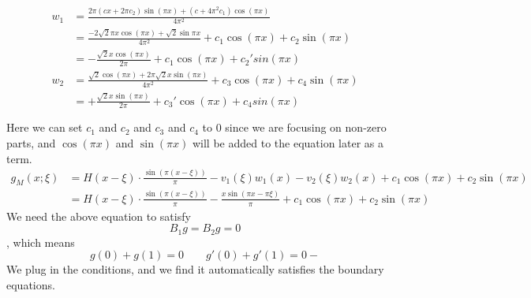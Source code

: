 \documentclass{article}
\begin{document}
\begin{align*}
   	w_1 &= \frac{2 \pi  \left(c x+2 \pi  c_2\right) \sin (\pi  x)+\left(c+4
   	\pi ^2 c_1\right) \cos (\pi  x)}{4 \pi ^2} 
   	\\&= \frac{-2 \sqrt{2}\pi  x\cos(\pi x)+\sqrt{2}\sin{\pi x}}{4 \pi^2} + c_1 \cos (\pi x) + c_2 \sin (\pi x)\\
   	&= -\frac{\sqrt{2}x\cos(\pi x)}{2 \pi}+c_1 \cos(\pi x) + c_2' sin(\pi x)\\
   	w_2 &= \frac{\sqrt{2}\cos(\pi x)+2 \pi \sqrt{2}x \sin(\pi x)}{4 \pi^2}+c_3 \cos (\pi x) + c_4 \sin (\pi x)
  	\\ &= +\frac{\sqrt{2}x\sin(\pi x)}{2 \pi}+c_3' \cos(\pi x) + c_4 sin(\pi x)\\\\
\end{align*}
Here we can set $c_1$ and $c_2$ and $c_3$ and $c_4$ to 0 since we are focusing on non-zero parts, and $\cos(\pi x)$ and $\sin(\pi x)$ will be added to the equation later as a term.
\begin{align*}
	g_M(x;\xi) &= H(x-\xi)\cdot \frac{\sin \left( \pi (x- \xi) \right)}{\pi} - v_1(\xi)w_1(x) - v_2(\xi)w_2(x) +c_1 \cos(\pi x)+c_2 \sin(\pi x) \\
	&= H(x-\xi)\cdot \frac{\sin \left( \pi (x- \xi) \right)}{\pi}- \frac{x\sin(\pi x - \pi \xi)}{\pi}+c_1 \cos(\pi x)+ c_2\sin(\pi x)
\end{align*}
We need the above equation to satisfy 
\[
	B_1g=B_2g= 0
\]
, which means 
\[
	g(0)+g(1) = 0 \qquad g'(0)+g'(1) = 0-
\] 
We plug in the conditions, and we find it automatically satisfies the boundary equations.
\end{document}
